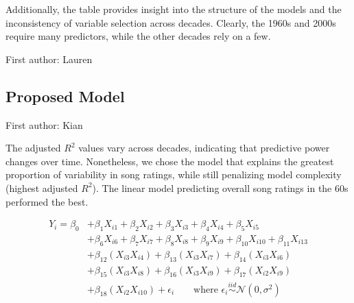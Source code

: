 \documentclass[11pt]{article}
\begin{document}
\noindent Additionally, the table provides insight into the structure of the models and the inconsistency of variable selection across decades.
\noindent Clearly, the 1960s and 2000s require many predictors, while the other decades rely on a few. 

{\scriptsize First author: Lauren}

\subsection{Proposed Model}

\begin{table}[H]
\centering
{}
\caption{Adjusted $R^2$ for Each Optimized Model Per Decade}
\end{table}

{\scriptsize First author: Kian}

The adjusted $R^2$ values vary across decades, indicating that predictive power changes over time. 
Nonetheless, we chose the model that explains the greatest proportion of variability in song ratings, while still penalizing model complexity (highest adjusted $R^2$).
The linear model predicting overall song ratings in the 60s performed the best.

\begin{equation}
\begin{aligned}
    Y_i = \beta_0 & + \beta_1 X_{i1} + \beta_2 X_{i2} + \beta_3 X_{i3} + \beta_4 X_{i4} + \beta_5 X_{i5} \\
                  & + \beta_6 X_{i6} + \beta_7 X_{i7} + \beta_8 X_{i8} + \beta_9 X_{i9} + \beta_{10} X_{i10} + \beta_{11} X_{i13} \\
                  & + \beta_{12} (X_{i3}X_{i4}) + \beta_{13} (X_{i3}X_{i7}) + \beta_{14} (X_{i3}X_{i6}) \\
                  & + \beta_{15} (X_{i3}X_{i8}) + \beta_{16} (X_{i3}X_{i9}) + \beta_{17} (X_{i2}X_{i9}) \\
                  & + \beta_{18} (X_{i2}X_{i10}) + \epsilon_i \qquad \text{where } \epsilon_i \overset{iid}{\sim} \mathcal{N}(0, \sigma^2)
\end{aligned}
\end{equation}
\end{document}
